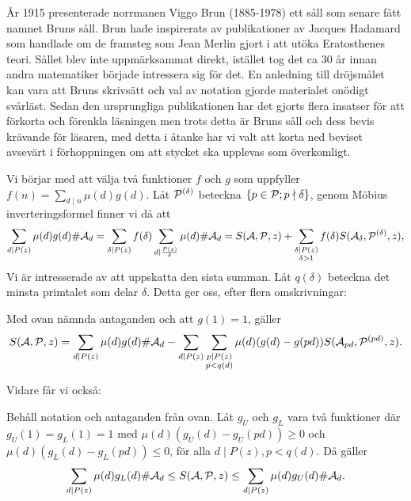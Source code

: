 
År 1915 presenterade norrmanen Viggo Brun (1885-1978) ett såll som senare fått namnet Bruns såll. Brun hade inspirerats av publikationer av Jacques Hadamard som handlade om de framsteg som Jean Merlin gjort i att utöka Eratosthenes teori. Sållet blev inte uppmärksammat direkt, istället tog det ca 30 år innan andra matematiker började intressera sig för det. En anledning till dröjsmålet kan vara att Bruns skrivsätt och val av notation gjorde materialet onödigt svårläst. Sedan den ursprungliga publikationen har det gjorts flera insatser för att förkorta och förenkla läsningen men trots detta är Bruns såll och dess bevis krävande för läsaren, med detta i åtanke har vi valt att korta ned beviset avsevärt i förhoppningen om att stycket ska upplevas som överkomligt.


\bigskip\noindent
Vi börjar med att välja två funktioner $f$ och $g$ som uppfyller $f(n) = \sum_{d\mid n} \mu(d) g(d)$. Låt $\P^{(\delta)}$ beteckna $\{ p\in\P;p \nmid \delta\}$,  genom Möbius inverteringsformel finner vi då att
\begin{align*}
    \sum_{d\mid P(z)} \mu(d) g(d) \card\A_d 
    = \sum_{\delta\mid P(z)} f(\delta) \sum_{d\mid \frac{P(z)}{\delta}} \mu(d) \card\A_d 
    = \S{A}{P}{z} + \sum_{\substack{\delta\mid P(z) \\ \delta>1}} f(\delta) \S{A_\delta}{P^{(\delta)}}{z},
\end{align*}
Vi är intresserade av att uppskatta den sista summan. Låt $q(\delta)$ beteckna det minsta primtalet som delar $\delta$. Detta ger oss, efter flera omskrivningar:


\begin{theorem}\label{brun_t1}
Med ovan nämnda antaganden och att $g(1)=1$, gäller 
\begin{equation*}
    \S{A}{P}{z} 
    = \sum_{d \mid P(z)} \mu(d) g(d) \card\A_d 
    - \sum_{d \mid P(z)} \sum_{\substack{p \mid P(z) \\ p<q(d)}} \mu(d) (g(d)-g(pd))
    S(\A_{pd},\P^{(pd)},z).      %
\end{equation*}
\end{theorem}


Vidare får vi också:
\begin{theorem}\label{brun_t2}
Behåll notation och antaganden från ovan. Låt $g_U$ och $g_L$ vara två funktioner där $g_U(1)=g_L(1)=1$ med $\mu(d)(g_U(d)-g_U(pd)) \geq 0$ och $\mu(d)(g_L(d)-g_L(pd)) \leq 0$, för alla $d \mid P(z), p < q(d)$. Då gäller
\begin{equation*}
    \sum_{d \mid P(z)} \mu(d) g_L(d) \card\A_d 
    \leq \S{A}{P}{z} 
    \leq \sum_{d \mid P(z)} \mu(d) g_U(d) \card\A_d.
\end{equation*}
\end{theorem}


